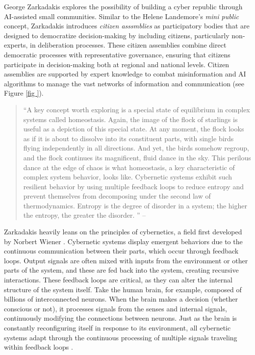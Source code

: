 George Zarkadakis  \parencite*{zarkadakes2020} explores the possibility of building a cyber republic through AI-assisted small communities. Similar to the Helene Landemore's
\parencite*{landemore2020} \textit{mini  public} concept, Zarkadakis introduces \textit{citizen asssmblies} as participatory bodies that are designed to democratize decision-making by including citizens, particularly non-experts, in deliberation processes. These citizen assemblies combine direct democratic processes with representative governance, ensuring that citizens participate in decision-making both at regional and national levels. Citizen assemblies are supported by expert knowledge to combat misinformation and AI algorithms to manage the vast networks of information and communication (see Figure \ref{fig
}).

\begin{quote}
  “A key concept worth exploring is a special state of equilibrium in complex systems called homeostasis. Again, the image of the flock of starlings is useful as a depiction of this special state. At any moment, the flock looks as if it is about to dissolve into its constituent parts, with single birds flying independently in all directions. And yet, the birds somehow regroup, and the flock continues its magnificent, fluid dance in the sky. This perilous dance at the edge of chaos is what homeostasis, a key characteristic of complex system behavior, looks like. Cybernetic systems exhibit such resilient behavior by using multiple feedback loops to reduce entropy and prevent themselves from decomposing under the second law of thermodynamics. Entropy is the degree of disorder in a system; the higher the entropy, the greater the disorder. ”
  -- \cite[27]{zarkadakes2020}
\end{quote}

Zarkadakis heavily leans on the principles of cybernetics, a field first developed by Norbert Wiener \parencite*{Wiener1948}. Cybernetic systems display emergent behaviors due to the continuous communication between their parts, which occur through feedback loops. Output signals are often mixed with inputs from the environment or other parts of the system, and these are fed back into the system, creating recursive interactions. These feedback loops are critical, as they can alter the internal structure of the system itself. Take the human brain, for example, composed of billions of interconnected neurons. When the brain makes a decision (whether conscious or not), it processes signals from the senses and internal signals, continuously modifying the connections between neurons. Just as the brain is constantly reconfiguring itself in response to its environment, all cybernetic systems adapt through the continuous processing of multiple signals traveling within feedback loops \parencite[24]{zarkadakes2020}.

